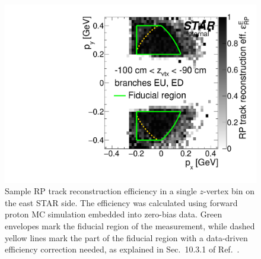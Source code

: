 \begin{figure}[ht!]%
\centering%
\begin{minipage}{.4725\textwidth}%
  \centering%
  \includegraphics[width=\linewidth,page=10]{graphics/corrections/mcFullEffPxPy.pdf}%
  \caption[Sample RP track reconstruction efficiency in a single $z$-vertex bin.]{Sample RP track reconstruction efficiency in a single $z$-vertex bin on the east STAR side. The efficiency was calculated using forward proton MC simulation embedded into zero-bias data. Green envelopes mark the fiducial region of the measurement, while dashed yellow lines mark the part of the fiducial region with a data-driven efficiency correction needed, as explained in Sec.~10.3.1 of Ref.~\cite{supplementaryNote}.\newline}\label{fig:rpEffSample}
\end{minipage}%
\quad\quad%
\begin{minipage}{.4725\textwidth}%
  \centering%

\end{minipage}
\end{figure}
